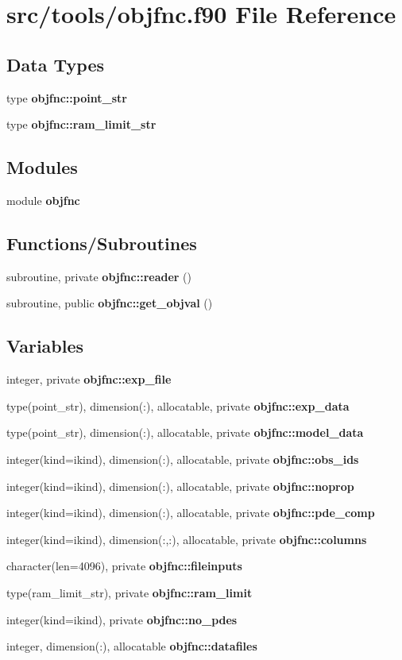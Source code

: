 \section{src/tools/objfnc.f90 File Reference}
\label{objfnc_8f90}
\subsection*{Data Types}
\begin{DoxyCompactItemize}
\item 
type {\bf objfnc\+::point\+\_\+str}
\item 
type {\bf objfnc\+::ram\+\_\+limit\+\_\+str}
\end{DoxyCompactItemize}
\subsection*{Modules}
\begin{DoxyCompactItemize}
\item 
module {\bf objfnc}
\end{DoxyCompactItemize}
\subsection*{Functions/\+Subroutines}
\begin{DoxyCompactItemize}
\item 
subroutine, private {\bf objfnc\+::reader} ()
\item 
subroutine, public {\bf objfnc\+::get\+\_\+objval} ()
\end{DoxyCompactItemize}
\subsection*{Variables}
\begin{DoxyCompactItemize}
\item 
integer, private {\bf objfnc\+::exp\+\_\+file}
\item 
type(point\+\_\+str), dimension(\+:), allocatable, private {\bf objfnc\+::exp\+\_\+data}
\item 
type(point\+\_\+str), dimension(\+:), allocatable, private {\bf objfnc\+::model\+\_\+data}
\item 
integer(kind=ikind), dimension(\+:), allocatable, private {\bf objfnc\+::obs\+\_\+ids}
\item 
integer(kind=ikind), dimension(\+:), allocatable, private {\bf objfnc\+::noprop}
\item 
integer(kind=ikind), dimension(\+:), allocatable, private {\bf objfnc\+::pde\+\_\+comp}
\item 
integer(kind=ikind), dimension(\+:,\+:), allocatable, private {\bf objfnc\+::columns}
\item 
character(len=4096), private {\bf objfnc\+::fileinputs}
\item 
type(ram\+\_\+limit\+\_\+str), private {\bf objfnc\+::ram\+\_\+limit}
\item 
integer(kind=ikind), private {\bf objfnc\+::no\+\_\+pdes}
\item 
integer, dimension(\+:), allocatable {\bf objfnc\+::datafiles}
\end{DoxyCompactItemize}
